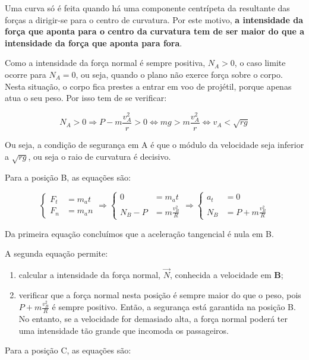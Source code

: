 \documentclass[a4paper,11pt,oneside]{report}
\begin{document}
Uma curva só é feita quando há uma componente centrípeta da resultante das forças a 
dirigir-se para o centro de curvatura. Por este motivo, \textbf{a intensidade da força 
que aponta para o centro da curvatura tem de ser maior do que a intensidade da força que 
aponta para fora}.

Como a intensidade da força normal é sempre positiva, $N_A > 0$, o caso limite ocorre para 
$N_A = 0$, ou seja, quando o plano não exerce força sobre o corpo. Nesta situação, o corpo 
fica prestes a entrar em voo de projétil, porque apenas atua o seu peso. Por isso tem de se 
verificar:

\[
N_A > 0 \Rightarrow P - m\frac{v_{A}^{2}}{r} > 0 \Leftrightarrow mg > m\frac{v_{A}^{2}}{r} \Leftrightarrow v_A < \sqrt{rg}
\]

Ou seja, a condição de segurança em A é que o módulo da velocidade seja inferior 
a $\sqrt{rg}$, ou seja o raio de curvatura é decisivo.

Para a posição B, as equações são: 

\[
\left\{
\begin{array}{cl}
F_t & = m_at \\
F_n & = m_an
\end{array}
\right.
\Rightarrow
\left\{
\begin{array}{cl}
0 & = m_at \\
N_B - P & = m\frac{v_{B}^{2}}{R}
\end{array}
\right.
\Rightarrow
\left\{
\begin{array}{cl}
a_t & = 0 \\
N_B & = P + m\frac{v_{B}^{2}}{R}
\end{array}
\right.
\]

Da primeira equação concluímos que a aceleração tangencial é nula em B.

A segunda equação permite:

\begin{enumerate}
    \item calcular a intensidade da força normal, $\vec N$, conhecida a velocidade em \textbf{B};
    \item verificar que a força normal nesta posição é sempre maior do que o peso, pois $P + m\frac{v_{B}^{2}}{R}$ é sempre positivo. Então, a segurança está garantida na posição B. No entanto, se a velocidade for demasiado alta, a força normal poderá ter uma intensidade tão grande que incomoda os passageiros.
\end{enumerate}

Para a posição C, as equações são:
\end{document}
